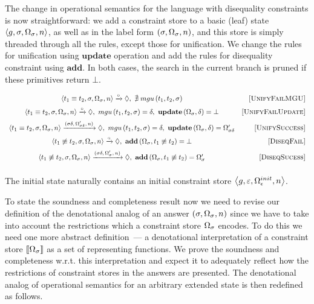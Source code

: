 The change in operational semantics for the language with disequality constraints is now straightforward: we add a constraint store to a basic (leaf) state $\left<{g, \sigma, \Omega_\sigma, n}\right>$,
as well as in the label form $(\sigma, \Omega_\sigma, n)$, and this store is simply threaded through all the rules, except those for unification. We change the rules
for unification using $\mathbf{update}$ operation and add the rules for disequality constraint using $\mathbf{add}$. In both cases, the search in the current branch is
pruned if these primitives return $\bot$.

 \[
  \begin{array}{cr}
    \left<{t_1 \equiv t_2, \sigma, \Omega_\sigma, n}\right> \xrightarrow{\circ} \Diamond , \, \, \nexists\; mgu\,(t_1, t_2, \sigma) &\mbox{[\textsc{UnifyFailMGU}]} \\[2mm]
    \left<{t_1 \equiv t_2, \sigma, \Omega_\sigma, n}\right> \xrightarrow{\circ} \Diamond , \, \, mgu\,(t_1, t_2, \sigma) = \delta, \, \, \mathbf{update}\,(\Omega_\sigma, \delta) = \bot &\mbox{[\textsc{UnifyFailUpdate}]} \\[2mm]
    \left<{t_1 \equiv t_2, \sigma, \Omega_\sigma, n}\right> \xrightarrow{(\sigma \delta, \, \Omega'_{\sigma\delta}, \, n)} \Diamond , \, \, mgu\,(t_1, t_2, \sigma) = \delta, \, \, \mathbf{update}\,(\Omega_\sigma, \delta) = \Omega'_{\sigma\delta} & \mbox{[\textsc{UnifySuccess}]} \\[2mm]
    \left<{t_1 \not\equiv t_2, \sigma, \Omega_\sigma, n}\right> \xrightarrow{\circ} \Diamond , \, \, \mathbf{add}\,(\Omega_\sigma, t_1 \not\equiv t_2) = \bot &\mbox{[\textsc{DiseqFail}]} \\[2mm]
    \left<{t_1 \not\equiv t_2, \sigma, \Omega_\sigma, n}\right> \xrightarrow{(\sigma \delta, \, \Omega'_{\sigma}, \, n)} \Diamond , \, \, \mathbf{add}\,(\Omega_\sigma, t_1 \not\equiv t_2) = \Omega'_\sigma &\mbox{[\textsc{DiseqSucess}]} \\[2mm]
  \end{array}
\]

The initial state naturally contains an initial constraint store $\left<{g, \varepsilon, \Omega_\epsilon^{init}, n}\right>$.

To state the soundness and completeness result now we need to revise our definition of the denotational analog of an answer $(\sigma, \Omega_\sigma, n)$
since we have to take into account the restrictions which a constraint store $\Omega_\sigma$ encodes.
To do this we need one more abstract definition~--- a denotational interpretation of a constraint store $\llbracket{\Omega_\sigma}\rrbracket$ as a set of representing functions.
We prove the soundness and completeness w.r.t. this interpretation and expect it to adequately reflect how the restrictions of constraint stores in the answers are presented.
The denotational analog of operational semantics for an arbitrary extended state is then redefined as follows.

